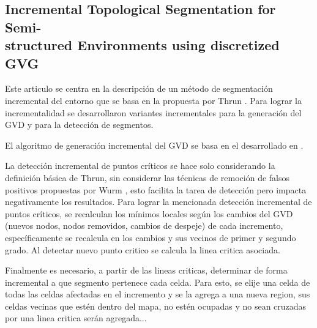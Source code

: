 \subsection[Incremental Topological Segmentation for Semi-structured Environments using discretized GVG]{Incremental Topological Segmentation for Semi-\\structured Environments using discretized GVG}

Este articulo se centra en la descripción de un método de segmentación incremental del entorno que se basa en la propuesta por Thrun \cite{Thrun1998}. Para lograr la incrementalidad se desarrollaron variantes incrementales para la generación del GVD y para la detección de segmentos.

El algoritmo de generación incremental del GVD se basa en el desarrollado en \cite{kalra2009incremental}. 

La detección incremental de puntos críticos se hace solo considerando la definición básica de Thrun, sin considerar las técnicas de remoción de falsos positivos propuestas por Wurm \cite{wurm2008coordinated}, esto facilita la tarea de detección pero impacta negativamente los resultados. Para lograr la mencionada detección incremental de puntos críticos, se recalculan los mínimos locales según los cambios del GVD (nuevos nodos, nodos removidos, cambios de despeje) de cada incremento, específicamente se recalcula en los cambios y sus vecinos de primer y segundo grado. Al detectar nuevo punto critico se calcula la linea critica asociada.

Finalmente es necesario, a partir de las lineas criticas, determinar de forma incremental a que segmento pertenece cada celda. Para esto, se elije una celda de todas las celdas afectadas en el incremento y se la agrega a una nueva region, sus celdas vecinas que estén dentro del mapa, no estén ocupadas y no sean cruzadas por una linea critica serán agregada...



    
